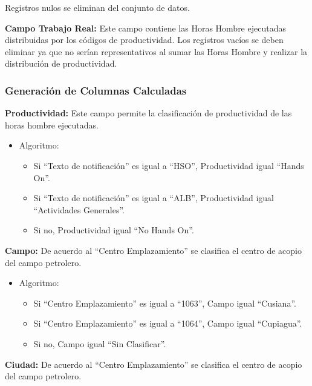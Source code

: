 \documentclass[
  11pt,
  bookmarksnumbered]{article}
\begin{document}
Registros nulos se eliminan del conjunto de datos.

\textbf{Campo Trabajo Real:} Este campo contiene las Horas Hombre ejecutadas distribuidas por los códigos de productividad.
Los registros vacíos se deben eliminar ya que no serían representativos al sumar las Horas Hombre y realizar la distribución de productividad.

\hypertarget{generaciuxf3n-de-columnas-calculadas}{%
\subsubsection{Generación de Columnas Calculadas}\label{generaciuxf3n-de-columnas-calculadas}}

\textbf{Productividad:} Este campo permite la clasificación de productividad de las horas hombre ejecutadas.

\begin{itemize}
\item
  Algoritmo:

  \begin{itemize}
  \item
    Si ``Texto de notificación'' es igual a ``HSO'', Productividad igual ``Hands On''.
  \item
    Si ``Texto de notificación'' es igual a ``ALB'', Productividad igual ``Actividades Generales''.
  \item
    Si no, Productividad igual ``No Hands On''.
  \end{itemize}
\end{itemize}

\textbf{Campo:} De acuerdo al ``Centro Emplazamiento'' se clasifica el centro de acopio del campo petrolero.

\begin{itemize}
\item
  Algoritmo:

  \begin{itemize}
  \item
    Si ``Centro Emplazamiento'' es igual a ``1063'', Campo igual ``Cusiana''.
  \item
    Si ``Centro Emplazamiento'' es igual a ``1064'', Campo igual ``Cupiagua''.
  \item
    Si no, Campo igual ``Sin Clasificar''.
  \end{itemize}
\end{itemize}

\textbf{Ciudad:} De acuerdo al ``Centro Emplazamiento'' se clasifica el centro de acopio del campo petrolero.
\end{document}
